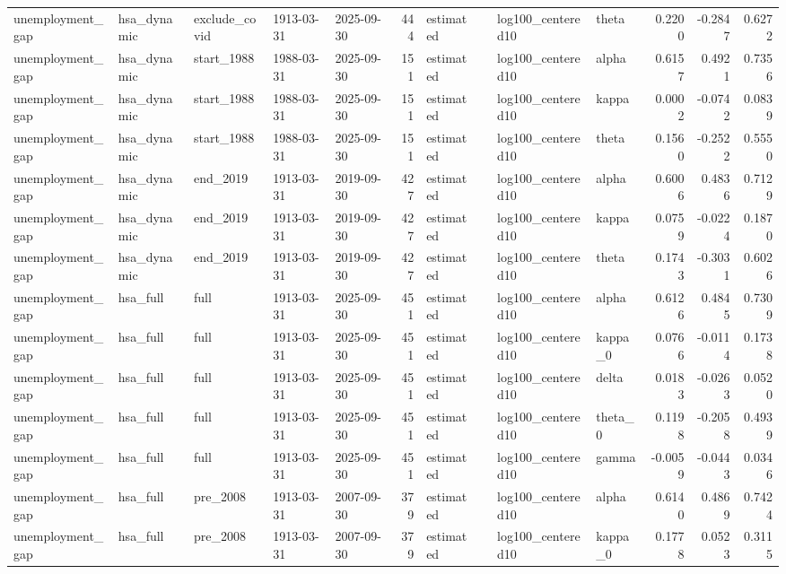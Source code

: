\begin{tabular}{lllllrllllrrr}
unemployment\_gap & hsa\_dynamic & exclude\_covid & 1913-03-31 & 2025-09-30 & 444 & estimated &  & log100\_centered10 & theta & 0.2200 & -0.2847 & 0.6272 \\
unemployment\_gap & hsa\_dynamic & start\_1988 & 1988-03-31 & 2025-09-30 & 151 & estimated &  & log100\_centered10 & alpha & 0.6157 & 0.4921 & 0.7356 \\
unemployment\_gap & hsa\_dynamic & start\_1988 & 1988-03-31 & 2025-09-30 & 151 & estimated &  & log100\_centered10 & kappa & 0.0002 & -0.0742 & 0.0839 \\
unemployment\_gap & hsa\_dynamic & start\_1988 & 1988-03-31 & 2025-09-30 & 151 & estimated &  & log100\_centered10 & theta & 0.1560 & -0.2522 & 0.5550 \\
unemployment\_gap & hsa\_dynamic & end\_2019 & 1913-03-31 & 2019-09-30 & 427 & estimated &  & log100\_centered10 & alpha & 0.6006 & 0.4836 & 0.7129 \\
unemployment\_gap & hsa\_dynamic & end\_2019 & 1913-03-31 & 2019-09-30 & 427 & estimated &  & log100\_centered10 & kappa & 0.0759 & -0.0224 & 0.1870 \\
unemployment\_gap & hsa\_dynamic & end\_2019 & 1913-03-31 & 2019-09-30 & 427 & estimated &  & log100\_centered10 & theta & 0.1743 & -0.3031 & 0.6026 \\
unemployment\_gap & hsa\_full & full & 1913-03-31 & 2025-09-30 & 451 & estimated &  & log100\_centered10 & alpha & 0.6126 & 0.4845 & 0.7309 \\
unemployment\_gap & hsa\_full & full & 1913-03-31 & 2025-09-30 & 451 & estimated &  & log100\_centered10 & kappa\_0 & 0.0766 & -0.0114 & 0.1738 \\
unemployment\_gap & hsa\_full & full & 1913-03-31 & 2025-09-30 & 451 & estimated &  & log100\_centered10 & delta & 0.0183 & -0.0263 & 0.0520 \\
unemployment\_gap & hsa\_full & full & 1913-03-31 & 2025-09-30 & 451 & estimated &  & log100\_centered10 & theta\_0 & 0.1198 & -0.2058 & 0.4939 \\
unemployment\_gap & hsa\_full & full & 1913-03-31 & 2025-09-30 & 451 & estimated &  & log100\_centered10 & gamma & -0.0059 & -0.0443 & 0.0346 \\
unemployment\_gap & hsa\_full & pre\_2008 & 1913-03-31 & 2007-09-30 & 379 & estimated &  & log100\_centered10 & alpha & 0.6140 & 0.4869 & 0.7424 \\
unemployment\_gap & hsa\_full & pre\_2008 & 1913-03-31 & 2007-09-30 & 379 & estimated &  & log100\_centered10 & kappa\_0 & 0.1778 & 0.0523 & 0.3115 \\

\end{tabular}
